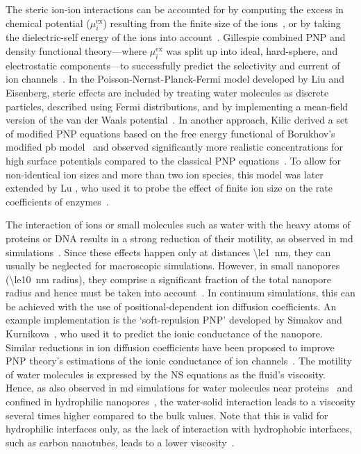 The steric ion-ion interactions can be accounted for by computing the excess in chemical potential
($\mu_{i}^\text{ex}$) resulting from the finite size of the ions~\cite{Eisenberg-1996,Bazant-2009,
Daiguji-2010}, or by taking the dielectric-self energy of the ions into account~\cite{Corry-2003,
Bonthuis-2006}. Gillespie \etal{} combined PNP and density functional theory---where $\mu_{i}^\text{ex}$ was
split up into ideal, hard-sphere, and electrostatic components---to successfully predict the selectivity and
current of ion channels~\cite{Gillespie-2002}. In the Poisson-Nernst-Planck-Fermi model developed by Liu and
Eisenberg, steric effects are included by treating water molecules as discrete particles, described using
Fermi distributions, and by implementing a mean-field version of the van der Waals
potential~\cite{Liu-2013,Liu-2015,Liu-2020}. In another approach, Kilic \etal{} derived a set of modified PNP
equations based on the free energy functional of Borukhov's modified \gls{pb} model~\cite{Borukhov-1997}
and observed significantly more realistic concentrations for high surface potentials compared to the classical
PNP equations~\cite{Kilic-2007}. To allow for non-identical ion sizes and more than two ion species, this
model was later extended by Lu \etal{}, who used it to probe the effect of finite ion size on the rate
coefficients of enzymes~\cite{Lu-2011}.

The interaction of ions or small molecules such as water with the heavy atoms of proteins or DNA results in a
strong reduction of their motility, as observed in \gls{md}
simulations~\cite{Makarov-1998,Pronk-2014,Wilson-2019}. Since these effects happen only at distances
\SI{\le1}{\nm}, they can usually be neglected for macroscopic simulations. However, in small nanopores
(\SI{\le10}{\nm} radius), they comprise a significant fraction of the total nanopore radius and hence must be
taken into account~\cite{Noskov-2004,Simakov-2010,Pederson-2015, McMullen-2017}. In continuum simulations,
this can be achieved with the use of positional-dependent ion diffusion coefficients. An example
implementation is the `soft-repulsion PNP' developed by Simakov and
Kurnikova~\cite{Simakov-2010,Simakov-2018}, who used it to predict the ionic conductance of the 
nanopore. Similar reductions in ion diffusion coefficients have been proposed to improve PNP theory's
estimations of the ionic conductance of ion channels~\cite{Furini-2006,Liu-2015, DeBiase-2015}. The motility
of water molecules is expressed by the NS equations as the fluid's viscosity. Hence, as also observed in
\gls{md} simulations for water molecules near proteins~\cite{Pronk-2014} and confined in hydrophilic
nanopores~\cite{Qiao-Aluru-2003,Vo-2016,Hsu-2017}, the water-solid interaction leads to a viscosity several
times higher compared to the bulk values. Note that this is valid for hydrophilic interfaces only, as the lack
of interaction with hydrophobic interfaces, such as carbon nanotubes, leads to a lower
viscosity~\cite{Ye-2011}.

